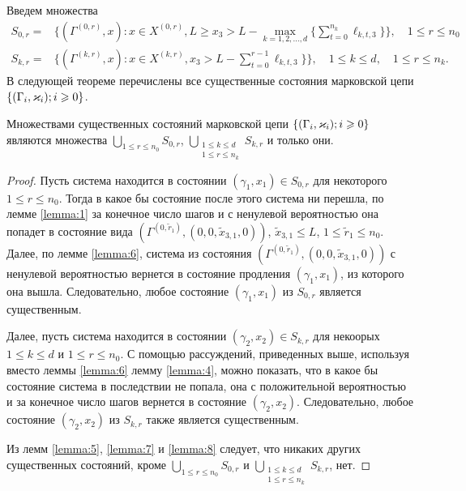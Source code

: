 \documentclass[a4paper,12pt,russian]{extarticle}
\newcommand{\G}{\Gamma}
\newcommand{\Mark}{\{(\G_i, \vk_i); i \geqslant 0\}}
\newcommand{\ga}[1]{\Gamma^{\left( #1 \right)} }
\begin{document}
Введем множества
\begin{equation*}
\begin{aligned}
S_{0,r} = & \{(\ga{0,r},x) \colon x\in X^{(0,r)}, L \geqslant x_3 > L - \max\limits_{k=1, 2, \ldots, d}\{\sum_{t=0}^{n_k} \ell_{k,t,3}\}\}, \quad 1 \leqslant r \leqslant n_0 \\
S_{k,r} = & \{(\ga{k,r},x) \colon x\in X^{(k,r)},x_3 > L - \sum_{t=0}^{r-1} \ell_{k,t,3}\} \}, \quad 1 \leqslant k \leqslant d,\quad 1 \leqslant r \leqslant n_k.
\end{aligned}
\end{equation*}
В следующей теореме перечислены все существенные состояния марковской цепи $\Mark$.
\begin{theorem}
Множествами существенных состояний марковской цепи $\Mark$ являются множества $\bigcup\limits_{1 \leqslant r \leqslant n_0}S_{0,r}$, $\bigcup\limits_{\substack{1 \leqslant k \leqslant d\\ 1 \leqslant r \leqslant n_k}} S_{k,r}$ и только они.
\end{theorem}
\begin{proof}
Пусть система находится в состоянии $(\gamma_1,x_1) \in S_{0,r}$ для некоторого $1 \leqslant r \leqslant n_0$. Тогда в какое бы состояние после этого система ни перешла, по лемме \ref{lemma:1} за конечное число шагов и с ненулевой вероятностью она попадет в состояние вида $(\ga{0,\tilde{r}_1}, (0,0,\tilde{x}_{3,1},0))$, $\tilde{x}_{3,1} \leqslant L$, $1 \leqslant \tilde{r}_1 \leqslant n_0$.  Далее, по лемме \ref{lemma:6}, система из состояния $(\ga{0,\tilde{r}_1}, (0,0,\tilde{x}_{3,1},0))$ с ненулевой вероятностью вернется в состояние продления $(\gamma_1,x_1)$, из которого она вышла. Следовательно, любое состояние $(\gamma_1,x_1)$ из $S_{0,r}$ является существенным.

Далее, пусть система находится в состоянии $(\gamma_2,x_2) \in S_{k,r}$ для некоорых $1 \leqslant k \leqslant d$ и  $1 \leqslant r \leqslant n_0$. С помощью рассуждений, приведенных выше, используя вместо леммы \ref{lemma:6} лемму \ref{lemma:4}, можно показать, что в какое бы состояние система в последствии не попала, она с положительной вероятностью и за конечное число шагов вернется в состояние $(\gamma_2,x_2)$. Следовательно, любое состояние $(\gamma_2,x_2)$ из $S_{k,r}$ также является существенным.

Из лемм \ref{lemma:5}, \ref{lemma:7} и \ref{lemma:8} следует, что никаких других существенных состояний, кроме $\bigcup\limits_{1 \leqslant r \leqslant n_0}S_{0,r}$ и $\bigcup\limits_{\substack{1 \leqslant k \leqslant d\\ 1 \leqslant r \leqslant n_k}} S_{k,r}$,  нет.
\end{proof}
\end{document}
